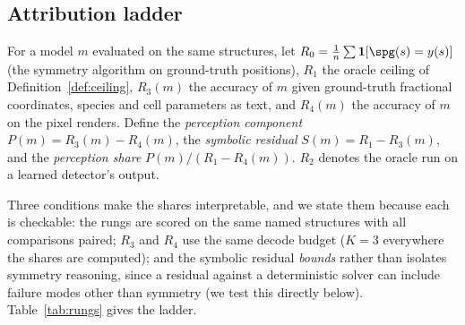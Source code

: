 \subsection{Attribution ladder}
\label{sec:ladder}

\begin{definition}
\label{def:ladder}
For a model $m$ evaluated on the same structures, let
$R_0 = \tfrac{1}{n}\sum \mathbf{1}[\spg(s) = y(s)]$ (the symmetry algorithm on ground-truth positions),
$R_1$ the oracle ceiling of Definition~\ref{def:ceiling},
$R_3(m)$ the accuracy of $m$ given ground-truth fractional coordinates, species and cell parameters as
text, and
$R_4(m)$ the accuracy of $m$ on the pixel renders. Define the \emph{perception component}
$P(m) = R_3(m) - R_4(m)$, the \emph{symbolic residual} $S(m) = R_1 - R_3(m)$, and the \emph{perception
share} $P(m) / (R_1 - R_4(m))$. $R_2$ denotes the oracle run on a learned detector's output.
\end{definition}

Three conditions make the shares interpretable, and we state them because each is checkable: the rungs are
scored on the same named structures with all comparisons paired; $R_3$ and $R_4$ use the same decode budget
($K{=}3$ everywhere the shares are computed); and the symbolic residual \emph{bounds} rather than isolates
symmetry reasoning, since a residual against a deterministic solver can include failure modes other than
symmetry (we test this directly below). Table~\ref{tab:rungs} gives the ladder.

